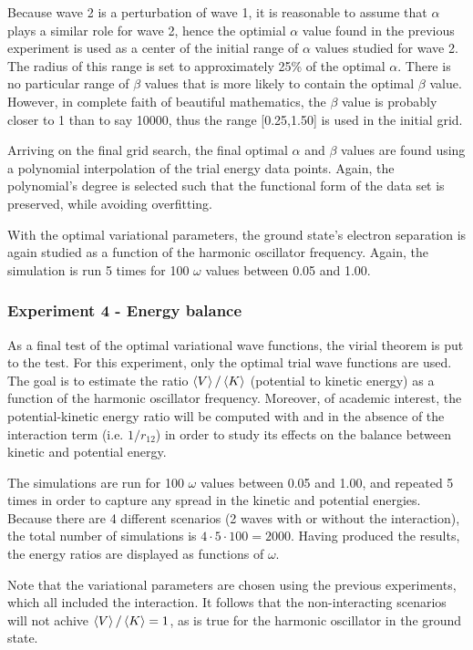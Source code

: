 \documentclass[nofootinbib,reprint,english]{revtex4-1}
\begin{document}
Because wave 2 is a perturbation of wave 1, it is reasonable to assume that \(\alpha\) plays a similar role for wave 2, hence the optimial \(\alpha\) value found in the previous experiment is used as a center of the initial range of \(\alpha\) values studied for wave 2. The radius of this range is set to approximately 25\% of the optimal \(\alpha\). There is no particular range of \(\beta\) values that is more likely to contain the optimal \(\beta\) value. However, in complete faith of beautiful mathematics, the \(\beta\) value is probably closer to 1 than to say 10000, thus the range [0.25,1.50] is used in the initial grid.

Arriving on the final grid search, the final optimal \(\alpha\) and \(\beta\) values are found using a polynomial interpolation of the trial energy data points. Again, the polynomial's degree is selected such that the functional form of the data set is preserved, while avoiding overfitting.

With the optimal variational parameters, the ground state's electron separation is again studied as a function of the harmonic oscillator frequency. Again, the simulation is run 5 times for 100 \(\omega\) values between 0.05 and 1.00.

\subsubsection{Experiment 4 - Energy balance}
As a final test of the optimal variational wave functions, the virial theorem is put to the test. For this experiment, only the optimal trial wave functions are used. The goal is to estimate the ratio \(\expval{V}/\expval{K}\) (potential to kinetic energy) as a function of the harmonic oscillator frequency. Moreover, of academic interest, the potential-kinetic energy ratio will be computed with and in the absence of the interaction term (i.e. \(1/r_{12}\)) in order to study its effects on the balance between kinetic and potential energy.

The simulations are run for 100 \(\omega\) values between 0.05 and 1.00, and repeated 5 times in order to capture any spread in the kinetic and potential energies. Because there are 4 different scenarios (2 waves with or without the interaction), the total number of simulations is \(4\cdot5\cdot100=2000\). Having produced the results, the energy ratios are displayed as functions of \(\omega\).

Note that the variational parameters are chosen using the previous experiments, which all included the interaction. It follows that the non-interacting scenarios will not achive \(\expval{V}/\expval{K}=1\), as is true for the harmonic oscillator in the ground state.
\end{document}
